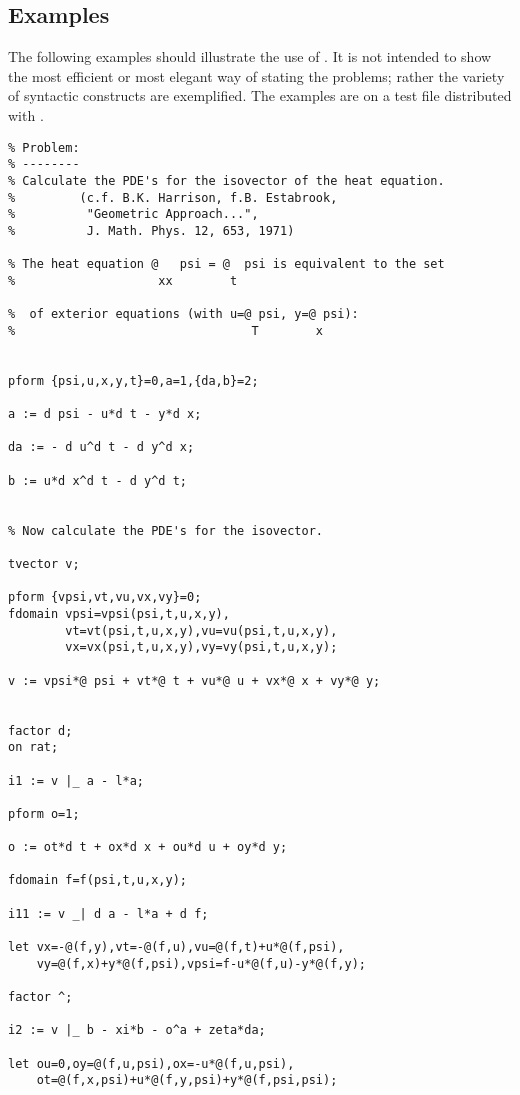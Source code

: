 \subsection{Examples}

The following examples should illustrate the use of . It is not
intended to show the most efficient or most elegant way of stating the
problems; rather the variety of syntactic constructs are exemplified.
The examples are on a test file distributed with .
{\small
\begin{verbatim}
% Problem:
% --------
% Calculate the PDE's for the isovector of the heat equation.
%         (c.f. B.K. Harrison, f.B. Estabrook,
%          "Geometric Approach...",
%          J. Math. Phys. 12, 653, 1971)

% The heat equation @   psi = @  psi is equivalent to the set
%                    xx        t

%  of exterior equations (with u=@ psi, y=@ psi):
%                                 T        x


pform {psi,u,x,y,t}=0,a=1,{da,b}=2;

a := d psi - u*d t - y*d x;

da := - d u^d t - d y^d x;

b := u*d x^d t - d y^d t;


% Now calculate the PDE's for the isovector.

tvector v;

pform {vpsi,vt,vu,vx,vy}=0;
fdomain vpsi=vpsi(psi,t,u,x,y),
        vt=vt(psi,t,u,x,y),vu=vu(psi,t,u,x,y),
        vx=vx(psi,t,u,x,y),vy=vy(psi,t,u,x,y);

v := vpsi*@ psi + vt*@ t + vu*@ u + vx*@ x + vy*@ y;


factor d;
on rat;

i1 := v |_ a - l*a;

pform o=1;

o := ot*d t + ox*d x + ou*d u + oy*d y;

fdomain f=f(psi,t,u,x,y);

i11 := v _| d a - l*a + d f;

let vx=-@(f,y),vt=-@(f,u),vu=@(f,t)+u*@(f,psi),
    vy=@(f,x)+y*@(f,psi),vpsi=f-u*@(f,u)-y*@(f,y);

factor ^;

i2 := v |_ b - xi*b - o^a + zeta*da;

let ou=0,oy=@(f,u,psi),ox=-u*@(f,u,psi),
    ot=@(f,x,psi)+u*@(f,y,psi)+y*@(f,psi,psi);


\end{verbatim}}
